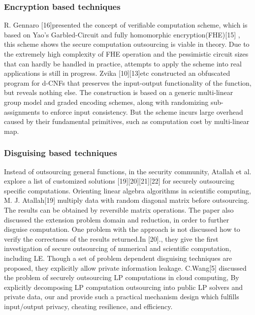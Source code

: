 \documentclass[runningheads,a4paper]{llncs}
\begin{document}
\subsubsection{Encryption based techniques}
R. Gennaro [16]presented the concept of verifiable computation scheme, which is based on Yao’s Garbled-Circuit and fully homomorphic encryption(FHE)[15] , this scheme shows the secure computation outsourcing is viable in theory. Due to the extremely high complexity of FHE operation and the pessimistic circuit sizes that can hardly be handled in practice, attempts to apply the scheme into real applications is still in progress.
Zvika [10][13]etc constructed an obfuscated program for d-CNFs that preserves the input-output functionality of the function, but reveals nothing else. The construction is based on a generic multi-linear group model and graded encoding schemes, along with randomizing sub-assignments to enforce input consistency. But the scheme incurs large overhead caused by their fundamental primitives, such as computation cost by multi-linear map.
\subsubsection{Disguising based techniques}
Instead of outsourcing general functions, in the security community, Atallah et al. explore a list of customized solutions [19][20][21][22] for securely outsourcing specific computations. Orienting linear algebra algorithms in scientific computing, M. J. Atallah[19] multiply data with random diagonal matrix before outsourcing. The results can be obtained by reversible matrix operations. The paper also discussed the extension problem domain and reduction, in order to further disguise computation. One problem with the approach is not discussed how to verify the correctness of the results returned.In [20]., they give the first investigation of secure outsourcing of numerical and scientific computation, including LE. Though a set of problem dependent disguising techniques are proposed, they explicitly allow private information leakage.
C.Wang[5] discussed the problem of securely outsourcing LP computations in cloud computing, By explicitly decomposing LP computation outsourcing into public LP solvers and private data, our 
and provide such a practical mechanism design which fulfills input/output privacy, cheating resilience, and efficiency.
% 
\end{document}
